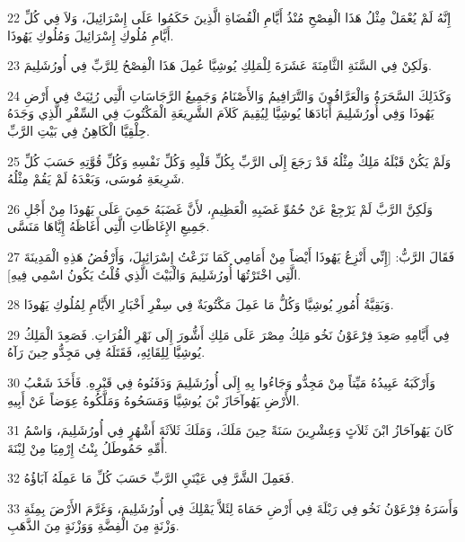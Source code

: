 \par 22 إِنَّهُ لَمْ يُعْمَلْ مِثْلُ هَذَا الْفِصْحِ مُنْذُ أَيَّامِ الْقُضَاةِ الَّذِينَ حَكَمُوا عَلَى إِسْرَائِيلَ، وَلاَ فِي كُلِّ أَيَّامِ مُلُوكِ إِسْرَائِيلَ وَمُلُوكِ يَهُوذَا.
\par 23 وَلَكِنْ فِي السَّنَةِ الثَّامِنَةَ عَشَرَةَ لِلْمَلِكِ يُوشِيَّا عُمِلَ هَذَا الْفِصْحُ لِلرَّبِّ فِي أُورُشَلِيمَ.
\par 24 وَكَذَلِكَ السَّحَرَةُ وَالْعَرَّافُونَ وَالتَّرَافِيمُ وَالأَصْنَامُ وَجَمِيعُ الرَّجَاسَاتِ الَّتِي رُئِيَتْ فِي أَرْضِ يَهُوذَا وَفِي أُورُشَلِيمَ أَبَادَهَا يُوشِيَّا لِيُقِيمَ كَلاَمَ الشَّرِيعَةِ الْمَكْتُوبَ فِي السِّفْرِ الَّذِي وَجَدَهُ حِلْقِيَّا الْكَاهِنُ فِي بَيْتِ الرَّبِّ.
\par 25 وَلَمْ يَكُنْ قَبْلَهُ مَلِكٌ مِثْلُهُ قَدْ رَجَعَ إِلَى الرَّبِّ بِكُلِّ قَلْبِهِ وَكُلِّ نَفْسِهِ وَكُلِّ قُوَّتِهِ حَسَبَ كُلِّ شَرِيعَةِ مُوسَى، وَبَعْدَهُ لَمْ يَقُمْ مِثْلُهُ.
\par 26 وَلَكِنَّ الرَّبَّ لَمْ يَرْجِعْ عَنْ حُمُوِّ غَضَبِهِ الْعَظِيمِ، لأَنَّ غَضَبَهُ حَمِيَ عَلَى يَهُوذَا مِنْ أَجْلِ جَمِيعِ الإِغَاظَاتِ الَّتِي أَغَاظَهُ إِيَّاهَا مَنَسَّى.
\par 27 فَقَالَ الرَّبُّ: [إِنِّي أَنْزِعُ يَهُوذَا أَيْضاً مِنْ أَمَامِي كَمَا نَزَعْتُ إِسْرَائِيلَ، وَأَرْفُضُ هَذِهِ الْمَدِينَةَ الَّتِي اخْتَرْتُهَا أُورُشَلِيمَ وَالْبَيْتَ الَّذِي قُلْتُ يَكُونُ اسْمِي فِيهِ].
\par 28 وَبَقِيَّةُ أُمُورِ يُوشِيَّا وَكُلُّ مَا عَمِلَ مَكْتُوبَةٌ فِي سِفْرِ أَخْبَارِ الأَيَّامِ لِمُلُوكِ يَهُوذَا.
\par 29 فِي أَيَّامِهِ صَعِدَ فِرْعَوْنُ نَخُو مَلِكُ مِصْرَ عَلَى مَلِكِ أَشُّورَ إِلَى نَهْرِ الْفُرَاتِ. فَصَعِدَ الْمَلِكُ يُوشِيَّا لِلِقَائِهِ، فَقَتَلَهُ فِي مَجِدُّو حِينَ رَآهُ.
\par 30 وَأَرْكَبَهُ عَبِيدُهُ مَيِّتاً مِنْ مَجِدُّو وَجَاءُوا بِهِ إِلَى أُورُشَلِيمَ وَدَفَنُوهُ فِي قَبْرِهِ. فَأَخَذَ شَعْبُ الأَرْضِ يَهُوآحَازَ بْنَ يُوشِيَّا وَمَسَحُوهُ وَمَلَّكُوهُ عِوَضاً عَنْ أَبِيهِ.
\par 31 كَانَ يَهُوآحَازُ ابْنَ ثَلاَثٍ وَعِشْرِينَ سَنَةً حِينَ مَلَكَ، وَمَلَكَ ثَلاَثَةَ أَشْهُرٍ فِي أُورُشَلِيمَ، وَاسْمُ أُمِّهِ حَمُوطَلُ بِنْتُ إِرْمِيَا مِنْ لِبْنَةَ.
\par 32 فَعَمِلَ الشَّرَّ فِي عَيْنَيِ الرَّبِّ حَسَبَ كُلِّ مَا عَمِلَهُ آبَاؤُهُ.
\par 33 وَأَسَرَهُ فِرْعَوْنُ نَخُو فِي رَبْلَةَ فِي أَرْضِ حَمَاةَ لِئَلاَّ يَمْلِكَ فِي أُورُشَلِيمَ، وَغَرَّمَ الأَرْضَ بِمِئَةِ وَزْنَةٍ مِنَ الْفِضَّةِ وَوَزْنَةٍ مِنَ الذَّهَبِ.
